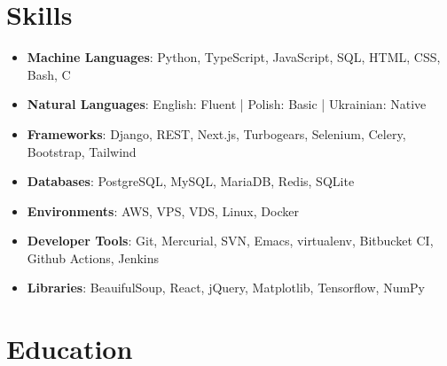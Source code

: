 \section{Skills}
\begin{itemize}
\item \textbf{Machine Languages}:  Python, TypeScript, JavaScript, SQL, HTML, CSS, Bash, C
\item \textbf{Natural Languages}:  English: Fluent | Polish: Basic | Ukrainian: Native
\item \textbf{Frameworks}: Django, REST, Next.js, Turbogears, Selenium, Celery, Bootstrap, Tailwind
\item \textbf{Databases}: PostgreSQL, MySQL, MariaDB, Redis, SQLite
\item \textbf{Environments}: AWS, VPS, VDS, Linux, Docker
\item \textbf{Developer Tools}: Git, Mercurial, SVN, Emacs, virtualenv, Bitbucket CI, Github Actions, Jenkins
\item \textbf{Libraries}: BeauifulSoup, React, jQuery, Matplotlib, Tensorflow, NumPy
\end{itemize}

\section{Education}



